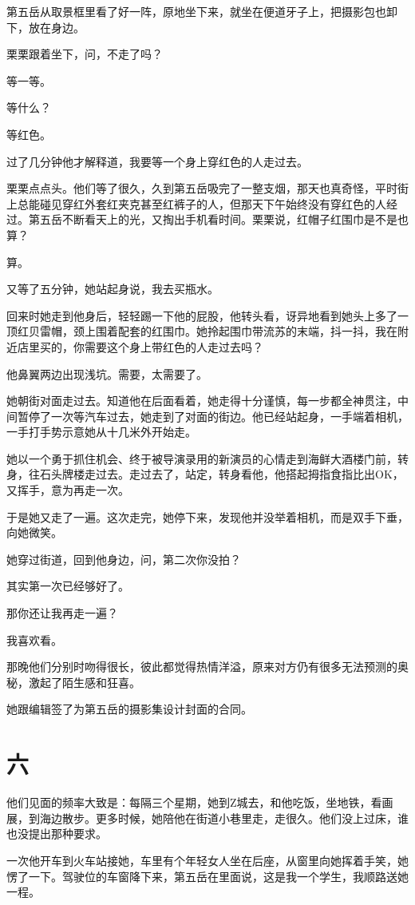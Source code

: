 \documentclass[lang=cn,newtx,12pt,scheme=chinese]{elegantbook}
\begin{document}
第五岳从取景框里看了好一阵，原地坐下来，就坐在便道牙子上，把摄影包也卸下，放在身边。

栗栗跟着坐下，问，不走了吗？

等一等。

等什么？

等红色。

过了几分钟他才解释道，我要等一个身上穿红色的人走过去。

栗栗点点头。他们等了很久，久到第五岳吸完了一整支烟，那天也真奇怪，平时街上总能碰见穿红外套红夹克甚至红裤子的人，但那天下午始终没有穿红色的人经过。第五岳不断看天上的光，又掏出手机看时间。栗栗说，红帽子红围巾是不是也算？

算。

又等了五分钟，她站起身说，我去买瓶水。

回来时她走到他身后，轻轻踢一下他的屁股，他转头看，讶异地看到她头上多了一顶红贝雷帽，颈上围着配套的红围巾。她拎起围巾带流苏的末端，抖一抖，我在附近店里买的，你需要这个身上带红色的人走过去吗？

他鼻翼两边出现浅坑。需要，太需要了。

她朝街对面走过去。知道他在后面看着，她走得十分谨慎，每一步都全神贯注，中间暂停了一次等汽车过去，她走到了对面的街边。他已经站起身，一手端着相机，一手打手势示意她从十几米外开始走。

她以一个勇于抓住机会、终于被导演录用的新演员的心情走到海鲜大酒楼门前，转身，往石头牌楼走过去。走过去了，站定，转身看他，他搭起拇指食指比出OK，又挥手，意为再走一次。

于是她又走了一遍。这次走完，她停下来，发现他并没举着相机，而是双手下垂，向她微笑。

她穿过街道，回到他身边，问，第二次你没拍？

其实第一次已经够好了。

那你还让我再走一遍？

我喜欢看。

那晚他们分别时吻得很长，彼此都觉得热情洋溢，原来对方仍有很多无法预测的奥秘，激起了陌生感和狂喜。

她跟编辑签了为第五岳的摄影集设计封面的合同。
\section{六}
他们见面的频率大致是：每隔三个星期，她到Z城去，和他吃饭，坐地铁，看画展，到海边散步。更多时候，她陪他在街道小巷里走，走很久。他们没上过床，谁也没提出那种要求。

一次他开车到火车站接她，车里有个年轻女人坐在后座，从窗里向她挥着手笑，她愣了一下。驾驶位的车窗降下来，第五岳在里面说，这是我一个学生，我顺路送她一程。
\end{document}
